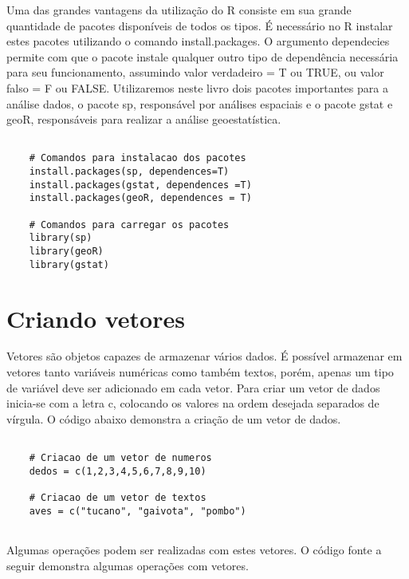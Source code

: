 Uma das grandes vantagens da utilização do R consiste em sua grande quantidade de pacotes disponíveis de todos os tipos. É necessário no R instalar estes pacotes utilizando o comando install.packages. O argumento dependecies permite com que o pacote instale qualquer outro tipo de dependência necessária para seu funcionamento, assumindo valor verdadeiro = T ou TRUE, ou valor falso = F ou FALSE.  Utilizaremos neste livro dois pacotes importantes para a análise dados, o pacote sp, responsável por análises espaciais e o pacote gstat e geoR, responsáveis para realizar a análise geoestatística. 

\begin{scriptsize}
	\estiloR
	\begin{lstlisting}[caption={Código fonte em R para instalação dos pacotes necessários}, label=lst:rcode]
	
	# Comandos para instalacao dos pacotes
	install.packages(sp, dependences=T)
	install.packages(gstat, dependences =T)
	install.packages(geoR, dependences = T)
	
	# Comandos para carregar os pacotes 
	library(sp)
	library(geoR)
	library(gstat)
	\end{lstlisting}
\end{scriptsize}

\section{Criando vetores}

Vetores são objetos capazes de armazenar vários dados. É possível armazenar em vetores tanto variáveis numéricas como também textos, porém, apenas um tipo de variável deve ser adicionado em cada vetor. Para criar um vetor de dados inicia-se com a letra c, colocando os valores na ordem desejada separados de vírgula. O código abaixo demonstra  a criação de um vetor de dados. 

\begin{scriptsize}
	\estiloR
	\begin{lstlisting}[]
	
	# Criacao de um vetor de numeros
	dedos = c(1,2,3,4,5,6,7,8,9,10)
	
	# Criacao de um vetor de textos
	aves = c("tucano", "gaivota", "pombo")
	
	\end{lstlisting}
\end{scriptsize}

Algumas operações podem ser realizadas com estes vetores. O código fonte a seguir demonstra algumas operações com vetores.

